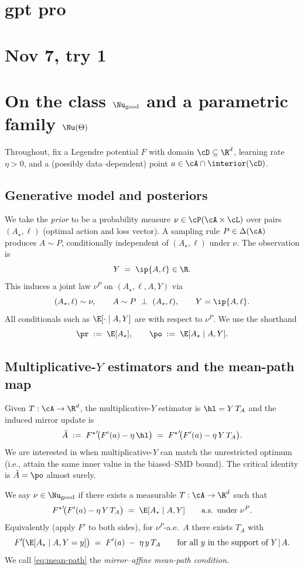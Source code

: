 \section{gpt pro}
\section{Nov 7, try 1}
\section{On the class \texorpdfstring{$\Nu_{\text{good}}$}{Nu\_good} and a parametric family \texorpdfstring{$\Nu(\Theta)$}{Nu(Theta)}}

Throughout, fix a Legendre potential $F$ with domain $\cD\subseteq\R^d$, learning rate $\eta>0$, and a (possibly data–dependent) point $a\in \cA\cap\interior(\cD)$.

\subsection{Generative model and posteriors}
We take the \emph{prior} to be a probability measure $\nu\in\cP(\cA\times\cL)$ over pairs $(A_\star,\ell)$ (optimal action and loss vector). A sampling rule $P\in\Delta(\cA)$ produces $A\sim P$, conditionally independent of $(A_\star,\ell)$ under $\nu$. The observation is
\[
    Y\;=\;\ip{A,\ell}\in\R.
\]
This induces a joint law $\nu^P$ on $(A_\star,\ell,A,Y)$ via
\[
    (A_\star,\ell)\sim \nu,\qquad A\sim P\ \perp\ (A_\star,\ell),\qquad Y=\ip{A,\ell}.
\]
All conditionals such as $\E[\cdot\mid A,Y]$ are with respect to $\nu^P$.
We use the shorthand
\[
    \pr \; := \; \E[A_\star],\qquad \po \;:=\; \E[A_\star\mid A,Y].
\]

\subsection{Multiplicative-\texorpdfstring{$Y$}{Y} estimators and the mean-path map}
Given $T:\cA\to\R^d$, the multiplicative-$Y$ estimator is $\hl=Y\,T_A$ and the induced mirror update is
\[
    \tilde A \;:=\; {F^\star}'\!\big(F'(a)-\eta\,\hl\big)\;=\;{F^\star}'\!\big(F'(a)-\eta\,Y\,T_A\big).
\]
We are interested in when multiplicative-$Y$ can match the unrestricted optimum (i.e., attain the same inner value in the biased–SMD bound). The critical identity is $\tilde A=\po$ almost surely.

\begin{definition}
    \label{def:Nu-good}
    We say $\nu\in\Nu_{\text{good}}$ if there exists a measurable $T:\cA\to\R^d$ such that
    \[
        {F^\star}'\!\big(F'(a)-\eta\,Y\,T_A\big)\;=\;\E[A_\star\mid A,Y]\qquad\text{a.s. under }\nu^P.
    \]
    Equivalently (apply $F'$ to both sides), for $\nu^P$-a.e.\ $A$ there exists $T_A$ with
    \begin{equation}
        \label{eq:mean-path}
        F'\!\big(\E[A_\star\mid A, Y=y]\big)\;=\;F'(a)\;-\;\eta\,y\,T_A\qquad\text{for all $y$ in the support of $Y\!\mid\!A$.}
    \end{equation}
    We call \eqref{eq:mean-path} the \emph{mirror–affine mean-path condition}.
\end{definition}

